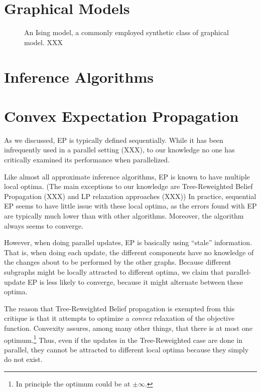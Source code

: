 \documentclass[times, 10pt,twocolumn]{article}
\begin{document}
\section{Graphical Models}

\begin{figure}
  [ising model here XXX]
  \caption{An Ising model, a commonly employed synthetic class of
  graphical model. XXX}
  \label{fig:ising}
\end{figure}

\section{Inference Algorithms}

\section{Convex Expectation Propagation}

As we discussed, EP is typically defined sequentially. While it has
been infrequently used in a parallel setting (XXX), to our knowledge
no one has critically examined its performance when parallelized.

Like almost all approximate inference algorithms, EP is known to
have multiple local optima. (The main exceptions to our knowledge
are Tree-Reweighted Belief Propagation (XXX) and LP relaxation
approaches (XXX)) In practice, sequential EP seems to have little
issue with these local optima, as the errors found with EP are
typically much lower than with other algorithms. Moreover, the
algorithm always seems to converge.

However, when doing parallel updates, EP is basically using
``stale'' information. That is, when doing each update, the
different components have no knowledge of the changes about to be
performed by the other graphs. Because different subgraphs might
be locally attracted to different optima, we claim that
parallel-update EP is less likely to converge, because it might
alternate between these optima. 

The reason that Tree-Reweighted Belief propagation is exempted from
this critique is that it attempts to optimize a \textit{convex}
relaxation of the objective function. Convexity assures, among many
other things, that there is at most one optimum.\footnote{In principle
the optimum could be at $\pm\infty$.} Thus, even if the updates in
the Tree-Reweighted case are done in parallel, they cannot be
attracted to different local optima because they simply do not
exist.
\end{document}
